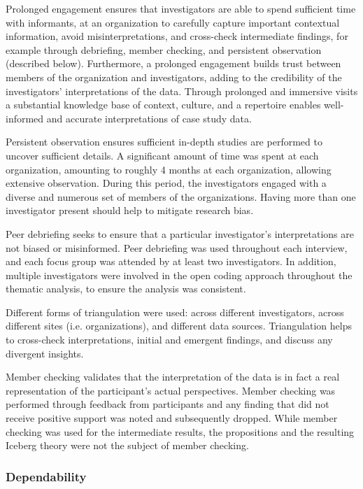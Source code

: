 \documentclass[smallextended]{svjour3}        %
\begin{document}
{Prolonged engagement} ensures that investigators are able to spend sufficient time with informants, at an organization to carefully capture important contextual information, avoid misinterpretations, and cross-check intermediate findings, for example through debriefing, member checking, and persistent observation (described below). 
Furthermore, a prolonged engagement builds trust between members of the organization and investigators, adding to the credibility of the investigators' interpretations of the data.
Through prolonged and immersive visits a substantial knowledge base of context, culture, and a repertoire enables well-informed and accurate interpretations of case study data.

{Persistent observation} ensures sufficient in-depth studies are performed to uncover sufficient details.
A significant amount of time was spent at each organization, amounting to roughly 4 months at each organization, allowing extensive observation. 
During this period, the investigators engaged with a diverse and numerous set of members of the organizations. 
Having more than one investigator present should help to mitigate research bias.

{Peer debriefing} seeks to ensure that a particular investigator's interpretations are not biased or misinformed.
Peer debriefing was used throughout each interview, and each focus group was attended by at least two investigators.
In addition, multiple investigators were involved in the open coding approach throughout the thematic analysis, to ensure the analysis was consistent.

Different forms of {triangulation} were used: across different investigators, across different sites (i.e. organizations), and different data sources. Triangulation helps to cross-check interpretations, initial and emergent findings, and discuss any divergent insights.


Member checking validates that the interpretation of the data is in fact a real representation of the participant's actual perspectives.
Member checking was performed through feedback from participants and any finding that did not receive positive support was noted and subsequently dropped. While member checking was used for the intermediate results, the propositions and the resulting Iceberg theory were not the subject of member checking. 



\subsubsection{Dependability}
\end{document}
